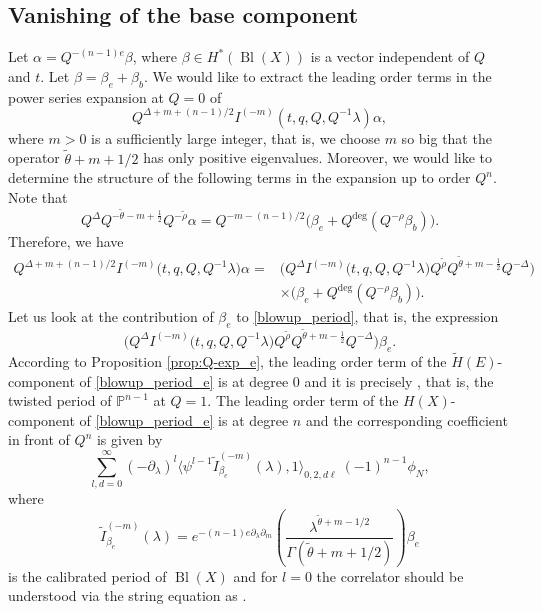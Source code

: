 \documentclass[10pt,a4paper]{article}
\numberwithin{equation}{section}
\newcommand{\leftexp}[2]{{\vphantom{#2}}^{#1}{#2}}
\newcommand{\PP}{\mathbb{P}}
\begin{document}
\subsection{Vanishing of the base component}
Let $\alpha=Q^{-(n-1)e}\beta$, where $\beta \in H^*(\operatorname{Bl}(X))$ is a vector independent of $Q$ and $t$. Let $\beta=\beta_e+\beta_b$. We would like to extract the leading order terms in the power series expansion at $Q=0$ of
\begin{equation}\label{blowup_period}
Q^{\Delta+m+(n-1)/2} I^{(-m)}\left(t,q,Q,Q^{-1}\lambda\right)\alpha,
\end{equation}
where $m>0$ is a sufficiently large integer, that is, we choose $m$ so
big that the operator $\widetilde{\theta}+m+1/2$ has only positive
eigenvalues.
Moreover, we would like to determine the structure of the following terms in the expansion up to order $Q^n$. Note that
\[
Q^{\Delta} Q^{-\widetilde\theta-m+\frac{1}{2}}Q^{-\widetilde\rho}\alpha =
Q^{-m-(n-1)/2} \big(
\beta_e + Q^{\operatorname{deg}} (Q^{-\rho} \beta_b)
\big).
\]
Therefore, we have
\begin{align*}
Q^{\Delta+m+(n-1)/2} I^{(-m)}\big(t,q,Q,Q^{-1}\lambda\big)\alpha={}&
\big(Q^\Delta I^{(-m)}\big(t,q,Q,Q^{-1}\lambda\big)Q^{\widetilde\rho}Q^{\widetilde\theta+m-\frac{1}{2}}Q^{-\Delta}\big)\\
&\times
\big(
\beta_e + Q^{\operatorname{deg}} (Q^{-\rho} \beta_b)
\big).
\end{align*}
Let us look at the contribution of $\beta_e$ to \eqref{blowup_period}, that is, the expression
\begin{equation}\label{blowup_period_e}
\big(Q^\Delta I^{(-m)}\big(t,q,Q,Q^{-1}\lambda\big)Q^{\widetilde\rho}Q^{\widetilde\theta+m-\frac{1}{2}}Q^{-\Delta}\big)
\beta_e.
\end{equation}
According to Proposition \ref{prop:Q-exp_e}, the leading order term of the $\widetilde{H}(E)$-component of \eqref{blowup_period_e} is at degree 0 and it is precisely \smash{$\leftexp{tw}{I}_{\beta_e}^{(-m)}(1,\lambda)$}, that is, the twisted period of $\PP^{n-1}$ at $Q=1$. The leading order term of the $H(X)$-component of \eqref{blowup_period_e} is at degree $n$ and the corresponding coefficient in front of $Q^n$ is given by
\begin{equation}\label{base_blowup_period_be:lot}
\sum_{l,d=0}^\infty
(-\partial_\lambda)^l \big\langle
\psi^{l-1} \widetilde{I}^{(-m)}_{\beta_e}(\lambda), 1\big\rangle_{0,2,d\ell} \
(-1)^{n-1}\phi_N,
\end{equation}
where
\[
\widetilde{I}^{(-m)}_{\beta_e}(\lambda)=
e^{-(n-1)e \partial_\lambda\partial_m} \left(
\frac{\lambda^{\widetilde{\theta}+m-1/2} }{
\Gamma(\widetilde{\theta}+m+1/2)}\right)\beta_e
\]
is the calibrated period of $\operatorname{Bl}(X)$ and for $l=0$ the correlator should be understood via the string equation as .
\end{document}
